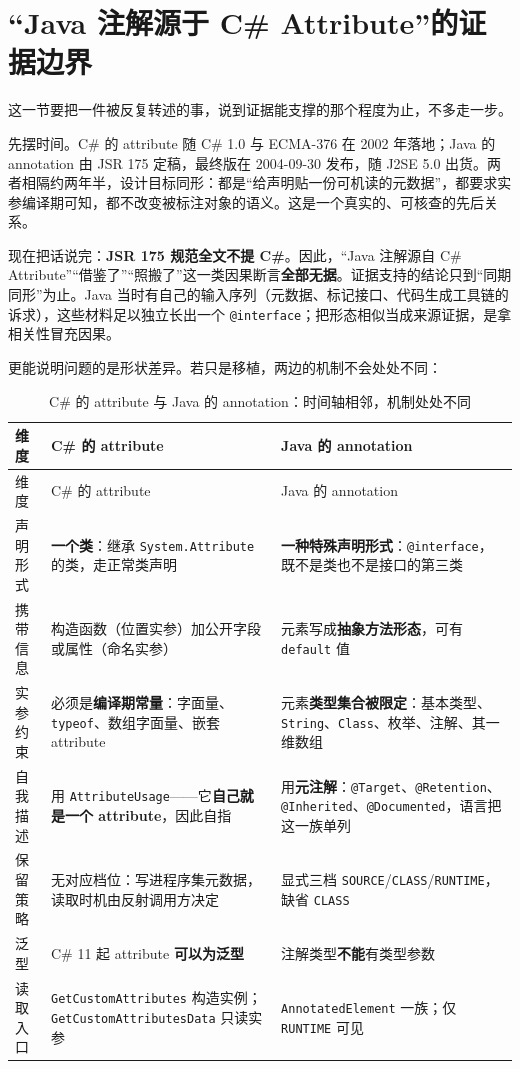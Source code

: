 \documentclass[12pt,a4paper,fontset=fandol]{ctexbook}
\begin{document}
\section{“Java 注解源于 C\# Attribute”的证据边界}
\label{sec:three-lineage}

这一节要把一件被反复转述的事，说到证据能支撑的那个程度为止，不多走一步。

先摆时间。C\# 的 attribute 随 C\# 1.0 与 ECMA-376 在 2002 年落地；Java 的 annotation 由 JSR 175 定稿，最终版在 2004-09-30 发布，随 J2SE 5.0 出货。两者相隔约两年半，设计目标同形：都是“给声明贴一份可机读的元数据”，都要求实参编译期可知，都不改变被标注对象的语义。这是一个真实的、可核查的先后关系。

现在把话说完：\textbf{JSR 175 规范全文不提 C\#}。因此，“Java 注解源自 C\# Attribute”“借鉴了”“照搬了”这一类因果断言\textbf{全部无据}。证据支持的结论只到“同期同形”为止。Java 当时有自己的输入序列（元数据、标记接口、代码生成工具链的诉求），这些材料足以独立长出一个 \texttt{@interface}；把形态相似当成来源证据，是拿相关性冒充因果。

更能说明问题的是形状差异。若只是移植，两边的机制不会处处不同：

{\footnotesize
\begin{longtable}{@{}>{\raggedright\arraybackslash}p{}>{\raggedright\arraybackslash}p{}>{\raggedright\arraybackslash}p{}@{}}
\caption{C\# 的 attribute 与 Java 的 annotation：时间轴相邻，机制处处不同}\label{tab:ch3-shape}\\
\toprule
维度 & C\# 的 attribute & Java 的 annotation \\
\midrule
\endfirsthead
\toprule
维度 & C\# 的 attribute & Java 的 annotation \\
\midrule
\endhead
\bottomrule
\endfoot
声明形式 & \textbf{一个类}：继承 \texttt{System.Attribute} 的类，走正常类声明 & \textbf{一种特殊声明形式}：\texttt{@interface}，既不是类也不是接口的第三类 \\
携带信息 & 构造函数（位置实参）加公开字段或属性（命名实参） & 元素写成\textbf{抽象方法形态}，可有 \texttt{default} 值 \\
实参约束 & 必须是\textbf{编译期常量}：字面量、\texttt{typeof}、数组字面量、嵌套 attribute & 元素\textbf{类型集合被限定}：基本类型、\texttt{String}、\texttt{Class}、枚举、注解、其一维数组 \\
自我描述 & 用 \texttt{AttributeUsage}——它\textbf{自己就是一个 attribute}，因此自指 & 用\textbf{元注解}：\texttt{@Target}、\texttt{@Retention}、\texttt{@Inherited}、\texttt{@Documented}，语言把这一族单列 \\
保留策略 & 无对应档位：写进程序集元数据，读取时机由反射调用方决定 & 显式三档 \texttt{SOURCE}/\texttt{CLASS}/\texttt{RUNTIME}，缺省 \texttt{CLASS} \\
泛型 & C\# 11 起 attribute \textbf{可以为泛型} & 注解类型\textbf{不能}有类型参数 \\
读取入口 & \texttt{GetCustomAttributes} 构造实例；\texttt{GetCustomAttributesData} 只读实参 & \texttt{AnnotatedElement} 一族；仅 \texttt{RUNTIME} 可见 \\
\end{longtable}}
\end{document}
